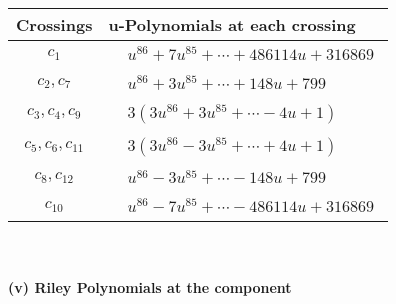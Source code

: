 \documentclass[1p]{elsarticle_modified}
\theoremstyle{definition}
\begin{document}
\begin{tabular}{m{50pt}|m{274pt}}
Crossings & \hspace{64pt}u-Polynomials at each crossing \\
\hline $$\begin{aligned}c_{1}\end{aligned}$$&$\begin{aligned}
&u^{86}+7 u^{85}+\cdots+486114 u+316869
\end{aligned}$\\
\hline $$\begin{aligned}c_{2},c_{7}\end{aligned}$$&$\begin{aligned}
&u^{86}+3 u^{85}+\cdots+148 u+799
\end{aligned}$\\
\hline $$\begin{aligned}c_{3},c_{4},c_{9}\end{aligned}$$&$\begin{aligned}
&3(3 u^{86}+3 u^{85}+\cdots-4 u+1)
\end{aligned}$\\
\hline $$\begin{aligned}c_{5},c_{6},c_{11}\end{aligned}$$&$\begin{aligned}
&3(3 u^{86}-3 u^{85}+\cdots+4 u+1)
\end{aligned}$\\
\hline $$\begin{aligned}c_{8},c_{12}\end{aligned}$$&$\begin{aligned}
&u^{86}-3 u^{85}+\cdots-148 u+799
\end{aligned}$\\
\hline $$\begin{aligned}c_{10}\end{aligned}$$&$\begin{aligned}
&u^{86}-7 u^{85}+\cdots-486114 u+316869
\end{aligned}$\\
\hline
\end{tabular}\\~\\
\newpage\renewcommand{\arraystretch}{1}
\flushleft \textbf{(v) Riley Polynomials at the component}\newline \\
\end{document}
